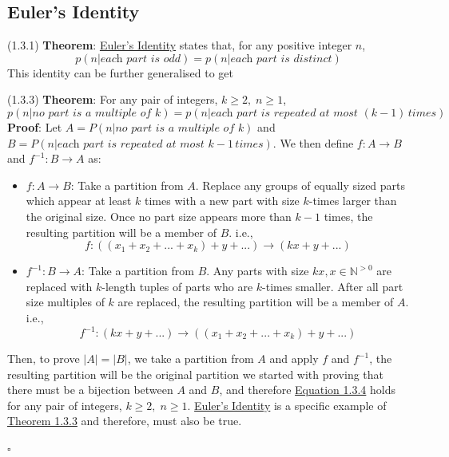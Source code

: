 \documentclass{article}
\newcommand{\separate}[1] {\vspace{#1 pt}\noindent}
\newcommand{\N}{\mathbb{N}}
\newcommand{\theorem}[2]{(#1) \textbf{Theorem}: #2}
\newcommand{\proof}[1]{\textbf{Proof}: #1 \begin{flushright}\(\square\)\end{flushright}}
\begin{document}
\newpage\subsection{Euler's Identity}

\theorem{1.3.1}{\underline{Euler's Identity}\label{thm:1.3.1} states that, for any positive integer \(n\),
\begin{equation}\tag{1.3.2}\label{eq:1.3.2}
    p(n|\textit{each part is odd}) = p(n|\textit{each part is distinct})
\end{equation}}
This identity can be further generalised to get

\separate{5}\theorem{1.3.3}\label{thm:1.3.3}{For any pair of integers, \(k \geq 2, \; n \geq 1\),
\begin{equation}\tag{1.3.4}\label{eq:1.3.4}
    p(n|\textit{no part is a multiple of } k) = p(n|\textit{each part is repeated at most } (k-1) \,{times})
\end{equation}}
\proof{Let \(A = P(n|\textit{no part is a multiple of } k)\) and \(B = P(n|\textit{each part is repeated at most } k-1 \,{times})\). We then define \(f:A \rightarrow B\) and \(f^{-1}: B \rightarrow A\) as:
\begin{itemize}
    \item \(f:A\rightarrow B\): Take a partition from \(A\). Replace any groups of equally sized parts which appear at least \(k\) times with a new part with size \(k\)-times larger than the original size. Once no part size appears more than \(k-1\) times, the resulting partition will be a member of \(B\). i.e.,
    \[f: ((x_1+x_2+...+x_k)+ y + ...) \rightarrow (kx + y + ...)\]
    \item \(f^{-1}:B \rightarrow A\): Take a partition from \(B\). Any parts with size \(kx, x \in \N^{>0}\) are replaced with \(k\)-length tuples of parts who are \(k\)-times smaller. After all part size multiples of \(k\) are replaced, the resulting partition will be a member of \(A\). i.e., 
    \[f^{-1}: (kx + y + ...) \rightarrow ((x_1 + x_2 + ... + x_k) + y + ...)\]
\end{itemize}
Then, to prove \(|A| = |B|\), we take a partition from \(A\) and apply \(f\) and \(f^{-1}\), the resulting partition will be the original partition we started with proving that there must be a bijection between \(A\) and \(B\), and therefore \hyperref[eq:1.3.4]{Equation 1.3.4} holds for any pair of integers, \(k \geq 2, \; n \geq 1\). \hyperref[thm:1.3.1]{Euler's Identity} is a specific example of \hyperref[thm:1.3.3]{Theorem 1.3.3} and therefore, must also be true.}
\end{document}
